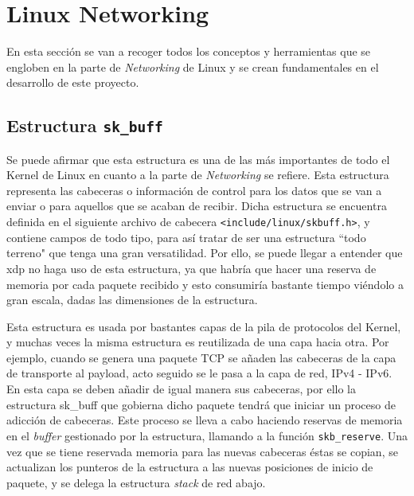 \section{Linux Networking}
\label{linuxNetworking}

En esta sección se van a recoger todos los conceptos y herramientas que se engloben en la parte de \textit{Networking} de Linux y se crean fundamentales en el desarrollo de este proyecto.  




\subsection{Estructura \texttt{sk\_buff}}
\label{linuxNetworking_skbuff}

Se puede afirmar que  esta estructura es una de las más importantes de todo el Kernel de Linux en cuanto a la parte de \textit{Networking} se refiere. Esta estructura representa las cabeceras o información de control para los datos que se van a enviar o para aquellos que se acaban de recibir. Dicha estructura se encuentra definida en el siguiente archivo de cabecera \texttt{<include/linux/skbuff.h>}, y contiene campos de todo tipo, para así tratar de ser una estructura ``todo terreno" que tenga una gran versatilidad. Por ello, se puede llegar a entender que \gls{xdp} no haga uso de esta estructura, ya que habría que hacer una reserva de memoria por cada paquete recibido y esto consumiría bastante tiempo viéndolo a gran escala, dadas las dimensiones de la estructura.\\
\par

Esta estructura es usada por bastantes capas de la pila de protocolos del Kernel, y muchas veces la misma estructura es reutilizada de una capa hacia otra. Por ejemplo, cuando se genera una paquete TCP se añaden las cabeceras de la capa de transporte al payload,  acto seguido se le pasa a la capa de red, IPv4 - IPv6. En esta capa se deben añadir de igual manera sus cabeceras, por ello la estructura sk\_buff que gobierna dicho paquete tendrá que iniciar un proceso de adicción de cabeceras. Este proceso se lleva a cabo haciendo reservas de memoria en el \textit{buffer} gestionado por la estructura, llamando a la función \texttt{skb\_reserve}. Una vez que se tiene reservada memoria para las nuevas cabeceras éstas se copian, se actualizan los punteros de la estructura a las nuevas posiciones de inicio de paquete, y se delega la estructura \textit{stack} de red abajo.\\
\par

